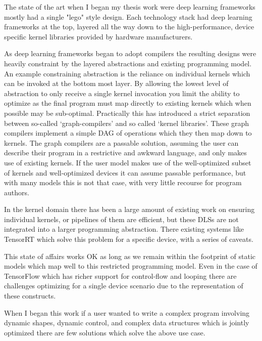 The state of the art when I began my thesis work were
  deep learning frameworks mostly had a single "lego" style design.
Each technology stack had deep learning frameworks at the top,
  layered all the way down to the high-performance,
  device specific kernel libraries provided by hardware manufacturers.

As deep learning frameworks began to adopt compilers
  the resulting designs were heavily constraint by the layered abstractions
  and existing programming model.
An example constraining abstraction is the reliance on individual
  kernels which can be invoked at the bottom most layer.
By allowing the lowest level of abstraction to only receive a single
  kernel invocation you limit the ability to optimize as the final
  program must map directly to existing kernels which when possible
  may be sub-optimal.
Practically this has introduced a strict separation between so-called
  ‘graph-compilers’ and so called ‘kernel libraries’.
These graph compilers implement a simple DAG of operations
  which they then map down to kernels.
The graph compilers are a passable solution, assuming the user can describe their program
  in a restrictive and awkward language, and only makes use of existing kernels.
If the user model makes use of the well-optimized subset of kernels and well-optimized devices
  it can assume passable performance, but with many models this is not that case, with very little recourse for program authors.

In the kernel domain there has been a large amount of existing work on
  ensuring individual kernels, or pipelines of them are efficient,
  but these DLSs are not integrated into a larger programming abstraction.
There existing systems like TensorRT which solve this problem for a specific device,
  with a series of caveats.

This state of affairs works OK as long as we remain within the footprint of static
  models which map well to this restricted programming model.
Even in the case of TensorFlow which has richer support for control-flow and
  looping there are challenges optimizing for a single device scenario due
  to the representation of these constructs.

When I began this work if a user wanted to write a complex program involving dynamic shapes,
  dynamic control, and complex data structures which is jointly optimized there are few
  solutions which solve the above use case.

